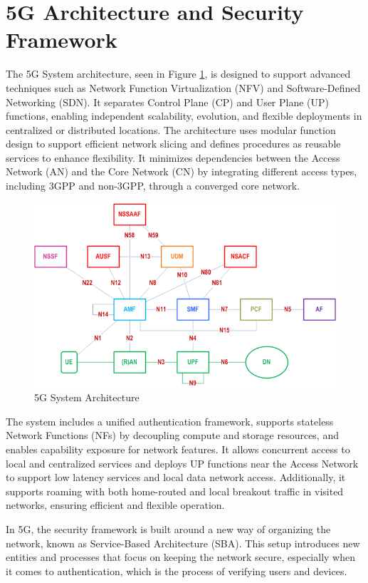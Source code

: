 \section{\acs{5G} Architecture and Security Framework}

The 5G System architecture, seen in Figure \ref{fig:5g-system-architecture}, is designed to support advanced techniques such as Network Function Virtualization (NFV) and Software-Defined Networking (SDN). It separates Control Plane (CP) and User Plane (UP) functions, enabling independent scalability, evolution, and flexible deployments in centralized or distributed locations. The architecture uses modular function design to support efficient network slicing and defines procedures as reusable services to enhance flexibility. It minimizes dependencies between the Access Network (AN) and the Core Network (CN) by integrating different access types, including 3GPP and non-3GPP, through a converged core network.

\begin{figure}
    \centering
    \includegraphics[width=0.75\linewidth]{figs/5g-system-architecture.png}
    \caption{5G System Architecture}
    \label{fig:5g-system-architecture}
\end{figure}

The system includes a unified authentication framework, supports stateless Network Functions (NFs) by decoupling compute and storage resources, and enables capability exposure for network features. It allows concurrent access to local and centralized services and deploys UP functions near the Access Network to support low latency services and local data network access. Additionally, it supports roaming with both home-routed and local breakout traffic in visited networks, ensuring efficient and flexible operation.%

In 5G, the security framework is built around a new way of organizing the network, known as Service-Based Architecture (SBA). This setup introduces new entities and processes that focus on keeping the network secure, especially when it comes to authentication, which is the process of verifying users and devices.

